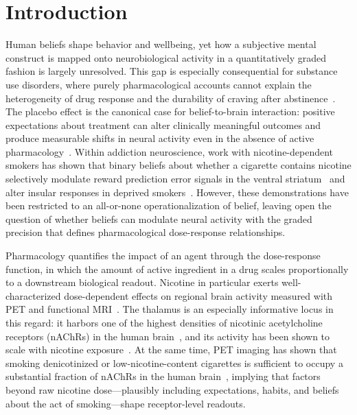 
\section{Introduction}

Human beliefs shape behavior and wellbeing, yet how a subjective mental construct is mapped onto neurobiological activity in a quantitatively graded fashion is largely unresolved. This gap is especially consequential for substance use disorders, where purely pharmacological accounts cannot explain the heterogeneity of drug response and the durability of craving after abstinence~\cite{picciotto2008nicotinic,benowitz2009pharmacology}. The placebo effect is the canonical case for belief-to-brain interaction: positive expectations about treatment can alter clinically meaningful outcomes and produce measurable shifts in neural activity even in the absence of active pharmacology~\cite{wager2004placebo,benedetti2013placebo}. Within addiction neuroscience, work with nicotine-dependent smokers has shown that binary beliefs about whether a cigarette contains nicotine selectively modulate reward prediction error signals in the ventral striatum~\cite{gu2015belief} and alter insular responses in deprived smokers~\cite{gu2016belief}. However, these demonstrations have been restricted to an all-or-none operationalization of belief, leaving open the question of whether beliefs can modulate neural activity with the graded precision that defines pharmacological dose-response relationships.

Pharmacology quantifies the impact of an agent through the dose-response function, in which the amount of active ingredient in a drug scales proportionally to a downstream biological readout. Nicotine in particular exerts well-characterized dose-dependent effects on regional brain activity measured with PET and functional MRI~\cite{brody2006cigarette,cosgrove2009beta2}. The thalamus is an especially informative locus in this regard: it harbors one of the highest densities of nicotinic acetylcholine receptors (nAChRs) in the human brain~\cite{picciotto2008nicotinic,cosgrove2009beta2}, and its activity has been shown to scale with nicotine exposure~\cite{brody2006cigarette}. At the same time, PET imaging has shown that smoking denicotinized or low-nicotine-content cigarettes is sufficient to occupy a substantial fraction of nAChRs in the human brain~\cite{brody2011ventral,cosgrove2009beta2}, implying that factors beyond raw nicotine dose---plausibly including expectations, habits, and beliefs about the act of smoking---shape receptor-level readouts.

